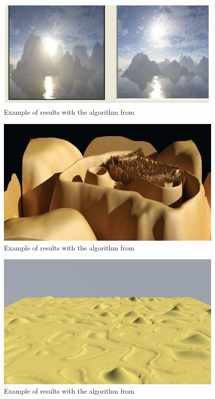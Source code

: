 \begin{figure}[htb]
	\centering
	\includegraphics[width=\linewidth]{RZL12/5zr45zr6z5.png}
	\caption{Example of results with the algorithm from \cite{walsh2011use}}
	\label{fig:tag17}
\end{figure}

\begin{figure}[htb]
	\centering
	\includegraphics[width=\linewidth]{RZL12/hfhhf.jpg}
	\caption{Example of results with the algorithm from \cite{frade2009breeding}}
	\label{fig:tag19}
\end{figure}

\begin{figure}[htb]
	\centering
	\includegraphics[width=\linewidth]{RZL12/06256610.jpg}
	\caption{Example of results with the algorithm from \cite{frade2010evolution2}}
	\label{fig:tag21}
\end{figure}

